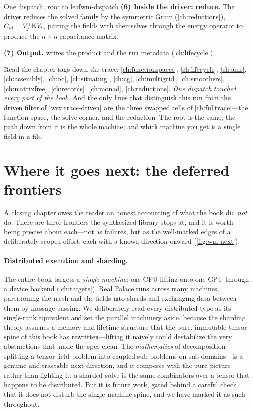 \begin{workedexample}{One dispatch, root to leaf}{wm-dispatch}
\textbf{(6) Inside the driver: reduce.} The driver reduces the solved family by the
symmetric Gram  (\cref{ch:reductions}), $C_{ij}=V_j^{\!\top}\mathsf{K}
V_i$, pairing the fields with themselves through the energy operator to produce the
$n\times n$ capacitance matrix.

\textbf{(7) Output.}  writes the product and the run metadata
(\cref{ch:lifecycle}).

\medskip
Read the chapter tags down the trace: \cref{ch:functionspaces}, \cref{ch:lifecycle},
\cref{ch:amr}, \cref{ch:assembly}, \cref{ch:bc}, \cref{ch:situating}, \cref{ch:cg},
\cref{ch:multigrid}, \cref{ch:smoothers}, \cref{ch:matrixfree}, \cref{ch:records},
\cref{ch:monad}, \cref{ch:reductions}. \emph{One dispatch touched every part of the
book.} And the only lines that distinguish this run from the driven filter of
\cref{wex:trace-driven} are the three swapped cells of \cref{ch:fulltrace}---the
function space, the solve corner, and the reduction. The root is the same; the path
down from it is the whole machine; and which machine you get is a single field in a
file.
\end{workedexample}

\section{Where it goes next: the deferred frontiers}
\label{sec:wm-frontiers}

A closing chapter owes the reader an honest accounting of what the book did
\emph{not} do. There are three frontiers the synthesized library stops at, and it is
worth being precise about each---not as failures, but as the well-marked edges of a
deliberately scoped effort, each with a known direction onward (\cref{fig:wm-next}).

\paragraph{Distributed execution and sharding.}
The entire book targets a \emph{single machine}: one CPU lifting onto one GPU through a
device backend (\cref{ch:targets}). Real Palace runs across many machines, partitioning
the mesh and the fields into shards and exchanging data between them by message passing.
We deliberately read every distributed type as its single-rank equivalent and set the
parallel machinery aside, because the sharding theory assumes a memory and lifetime
structure that the pure, immutable-tensor spine of this book has rewritten---lifting it
naively could destabilize the very abstractions that made the spec clean. The
\emph{mathematics} of decomposition---splitting a tensor-field problem into coupled
sub-problems on sub-domains---is a genuine and tractable next direction, and it composes
with the pure picture rather than fighting it: a sharded solve is the same combinators
over a tensor that happens to be distributed. But it is future work, gated behind a
careful check that it does not disturb the single-machine spine, and we have marked it
as such throughout.

